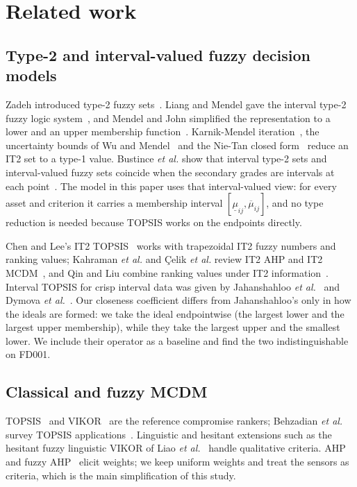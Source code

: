 \documentclass[journal,10pt,twocolumn]{IEEEtran}
\begin{document}
\section{Related work}
\subsection{Type-2 and interval-valued fuzzy decision models}
Zadeh introduced type-2 fuzzy sets~\cite{zadeh1975}. Liang and Mendel gave the interval type-2 fuzzy logic system~\cite{liang2000}, and Mendel and John simplified the representation to a lower and an upper membership function~\cite{mendel2002,mendel2006,mendel2017}. Karnik-Mendel iteration~\cite{karnik2001}, the uncertainty bounds of Wu and Mendel~\cite{wu2002} and the Nie-Tan closed form~\cite{nie2008} reduce an IT2 set to a type-1 value. Bustince \emph{et al.} show that interval type-2 sets and interval-valued fuzzy sets coincide when the secondary grades are intervals at each point~\cite{bustince2016}. The model in this paper uses that interval-valued view: for every asset and criterion it carries a membership interval $[\underline{\mu}_{ij},\overline{\mu}_{ij}]$, and no type reduction is needed because TOPSIS works on the endpoints directly.

Chen and Lee's IT2 TOPSIS~\cite{chen2010it2} works with trapezoidal IT2 fuzzy numbers and ranking values; Kahraman \emph{et al.} and \c{C}elik \emph{et al.} review IT2 AHP and IT2 MCDM~\cite{kahraman2014,celik2015}, and Qin and Liu combine ranking values under IT2 information~\cite{qin2015}. Interval TOPSIS for crisp interval data was given by Jahanshahloo \emph{et al.}~\cite{jahanshahloo2006} and Dymova \emph{et al.}~\cite{dymova2013}. Our closeness coefficient differs from Jahanshahloo's only in how the ideals are formed: we take the ideal endpointwise (the largest lower and the largest upper membership), while they take the largest upper and the smallest lower. We include their operator as a baseline and find the two indistinguishable on FD001.

\subsection{Classical and fuzzy MCDM}
TOPSIS~\cite{hwang1981} and VIKOR~\cite{opricovic2004} are the reference compromise rankers; Behzadian \emph{et al.} survey TOPSIS applications~\cite{behzadian2012}. Linguistic and hesitant extensions such as the hesitant fuzzy linguistic VIKOR of Liao \emph{et al.}~\cite{liao2015} handle qualitative criteria. AHP and fuzzy AHP~\cite{saaty1980,chang1996} elicit weights; we keep uniform weights and treat the sensors as criteria, which is the main simplification of this study.
\end{document}
